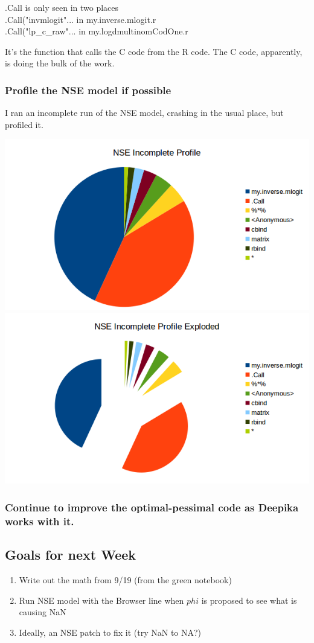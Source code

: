 \documentclass[11pt]{article} %
\begin{document}
.Call is only seen in two places\\
.Call("invmlogit"... in my.inverse.mlogit.r\\
.Call("lp\_c\_raw"... in my.logdmultinomCodOne.r

It's the function that calls the C code from the R code. The C code, apparently, is doing the bulk of the work.


\subsubsection{Profile the NSE model if possible}

I ran an incomplete run of the NSE model, crashing in the usual place, but profiled it.



\includegraphics{data/NSE_IncompleteProfile}
\includegraphics{data/NSE_IncompleteProfilexplode}



\subsubsection{Continue to improve the optimal-pessimal code as Deepika works with it.}





\subsection{Goals for next Week}
\begin{enumerate}
\item Write out the math from 9/19 (from the green notebook)
\item Run NSE model with the Browser line when $phi$ is proposed to see what is causing NaN
\item Ideally, an NSE patch to fix it (try NaN to NA?)
\end{enumerate}
\end{document}
